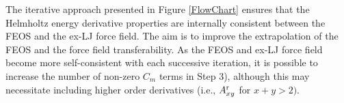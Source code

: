 \documentclass[12pt,a4paper]{article}
\begin{document}






The iterative approach presented in Figure \ref{FlowChart} ensures that the Helmholtz energy derivative properties are internally consistent between the FEOS and the ex-LJ force field. The aim is to improve the extrapolation of the FEOS and the force field transferability. As the FEOS and ex-LJ force field become more self-consistent with each successive iteration, it is possible to increase the number of non-zero $C_m$ terms in Step 3), although this may necessitate including higher order derivatives (i.e., $A_{xy}^{\rm r}$ for $x+y>2)$.
\end{document}
